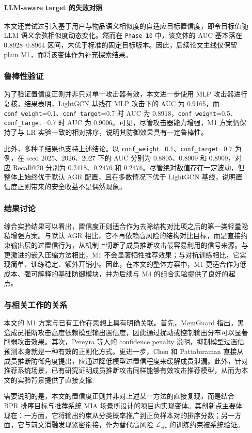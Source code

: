 \paragraph{LLM-aware target 的失败对照}
本文还尝试过引入基于用户与物品语义相似度的自适应目标置信度，即令目标值随 LLM 语义余弦相似度动态变化。然而在 \texttt{Phase 10} 中，该变体的 AUC 基本落在 0.8928--0.8964 区间，未优于标准的固定目标版本。因此，后续论文主线仅保留 plain M1，而将该变体作为补充探索结果。

\subsubsection{鲁棒性验证}
为了验证置信度正则并非只对单一攻击器有效，本文进一步使用 MLP 攻击器进行复核。结果表明，LightGCN 基线在 MLP 攻击下的 AUC 为 0.9165，而 \texttt{conf\_weight}=0.1、\texttt{conf\_target}=0.7 时 AUC 为 0.8918，\texttt{conf\_weight}=0.5、\texttt{conf\_target}=0.7 时 AUC 为 0.9006。可见，尽管攻击器能力增强，M1 方案仍保持了与 LR 实验一致的相对排序，说明其防御效果具有一定鲁棒性。

此外，多种子结果也支持上述结论。以 \texttt{conf\_weight}=0.1、\texttt{conf\_target}=0.7 为例，在 seed 2025、2026、2027 下的 AUC 分别为 0.8805、0.8909 和 0.8909，对应 Recall@20 分别为 0.2418、0.2476 和 0.2476。尽管绝对数值存在一定波动，但整体上始终优于默认 AGR 配置，且在多数情况下优于 LightGCN 基线，说明置信度正则带来的安全收益不是偶然现象。

\subsubsection{结果讨论}
综合实验结果可以看出，置信度正则适合作为去除结构对比项之后的第一类轻量隐私增强方案。与默认 AGR 相比，它不再依赖高风险的结构对比目标，而是直接约束输出层的过置信行为，从机制上切断了成员推断攻击最容易利用的信号来源。与更激进的嵌入压缩方法相比，M1 不会显著牺牲推荐效果；与对抗训练相比，它实现简单、训练稳定、额外开销小。因此，在本文的整体方案中，M1 更适合作为低成本、强可解释的基础防御模块，并为后续与 M4 的组合实验提供了良好的起点。

\subsubsection{与相关工作的关系}
本文的 M1 方案与已有工作在思想上具有明确关联。首先，MemGuard 指出，黑盒成员推断攻击高度依赖模型输出置信度，因此通过扰动或控制输出分布可以显著削弱攻击效果\cite{jia2019memguard}。其次，Pereyra 等人的 confidence penalty 说明，抑制模型过置信预测本身就是一种有效的正则化方式\cite{pereyra2017confidence}。更进一步，Chen 和 Pattabiraman 直接从成员推断防御角度提出，应通过降低模型过置信程度来缓解成员泄漏\cite{chen2024overconfidence}。此外，针对推荐系统场景，已有研究证明成员推断攻击同样能够有效攻击推荐模型，从而为本文的实验背景提供了直接支撑\cite{zhang2021miarec}.

需要说明的是，本文的置信度正则并非对上述某一方法的直接复现，而是结合 BPR 排序目标与推荐系统 MIA 场景所设计的项目内实现变体。其创新点主要体现在：一方面，它将输出约束从分类概率推广到正负样本对的排序分数；另一方面，它与前文消融发现紧密衔接，作为替代高风险 $\mathcal{L}_{str}$ 的训练约束被系统验证。
